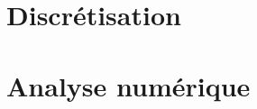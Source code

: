 \documentclass[a4paper]{article}
\begin{document}
\newpage
\section{Discrétisation}





\newpage
\section{Analyse numérique}

\newpage

\medskip


	
\end{document}
